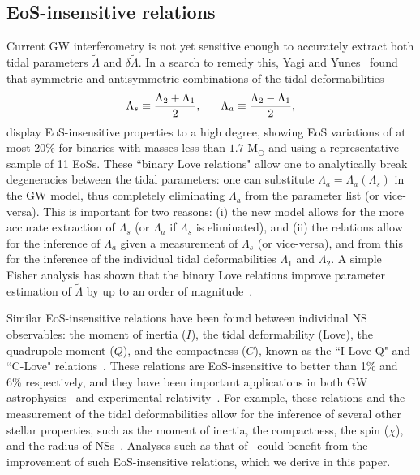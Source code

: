 \documentclass[prd,twocolumn,nofootinbib,superscriptaddress,amsmath,amssymb]{revtex4-1}
\begin{document}
\subsection{EoS-insensitive relations}\label{sec:eosInsensitive}
Current GW interferometry is not yet sensitive enough to accurately extract both tidal parameters $\tilde{\Lambda}$ and $\delta\tilde{\Lambda}$.
In a search to remedy this, Yagi and Yunes~\cite{Yagi:binLove} found that symmetric and antisymmetric combinations of the tidal deformabilities
\begin{equation}
\Lambda_s \equiv \frac{\Lambda_2 + \Lambda_1}{2}, \hspace{6mm} \Lambda_a \equiv \frac{\Lambda_2 - \Lambda_1}{2},
\end{equation}
display EoS-insensitive properties to a high degree, showing EoS variations of at most 20\% for binaries with masses less than $1.7 \text{ M}_{\odot}$ and using a representative sample of 11 EoSs. 
These ``binary Love relations" allow one to analytically break degeneracies between the tidal parameters: one can substitute $\Lambda_{a}=\Lambda_{a}(\Lambda_{s})$ in the GW model, thus completely eliminating $\Lambda_{a}$ from the parameter list (or vice-versa). This is important for two reasons: (i) the new model allows for the more accurate extraction of $\Lambda_{s}$ (or $\Lambda_{a}$ if $\Lambda_{s}$ is eliminated), and (ii) the relations allow for the inference of $\Lambda_{a}$ given a measurement of $\Lambda_{s}$ (or vice-versa), and from this for the inference of the individual tidal deformabilities $\Lambda_{1}$ and $\Lambda_{2}$. A simple Fisher analysis has shown that the binary Love relations improve parameter estimation of $\tilde{\Lambda}$ by up to an order of magnitude~\cite{Yagi:2015pkc,Yagi:binLove}.

Similar EoS-insensitive relations have been found between individual NS observables: the moment of inertia ($I$), the tidal deformability (Love), the quadrupole moment ($Q$), and the compactness ($C$), known as the ``I-Love-Q" and ``C-Love" relations~\cite{Yagi:2013bca,Yagi:ILQ, Maselli:2013mva}.
These relations are EoS-insensitive to better than 1\% and 6\% respectively, and they have been important applications in both GW astrophysics~\cite{Kumar:2019xgp} and experimental relativity~\cite{Yagi:2013bca,Yagi:ILQ,Gupta:2017vsl,Doneva:2017jop}. For example, these relations and the measurement of the tidal deformabilities allow for the inference of several other stellar properties, such as the moment of inertia, the  compactness, the spin ($\chi$), and the radius of NSs~\cite{Kumar:2019xgp}.
Analyses such as that of~\cite{Kumar:2019xgp} could benefit from the improvement of such EoS-insensitive relations, which we derive in this paper. 
\end{document}
